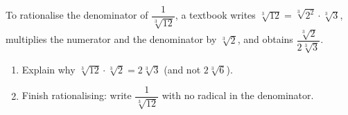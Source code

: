 To rationalise the denominator of $\dfrac{1}{\sqrt[3]{12}}$, a textbook writes $\sqrt[3]{12}=\sqrt[3]{2^2}\cdot\sqrt[3]3$, multiplies the numerator and the denominator by $\sqrt[3]2$, and obtains $\dfrac{\sqrt[3]2}{2\sqrt[3]3}$.
\begin{enumerate}
\item[(a)] Explain why $\sqrt[3]{12}\cdot\sqrt[3]2=2\sqrt[3]3$ (and not $2\sqrt[3]6$).
\item[(b)] Finish rationalising: write $\dfrac{1}{\sqrt[3]{12}}$ with no radical in the denominator.
\end{enumerate}
